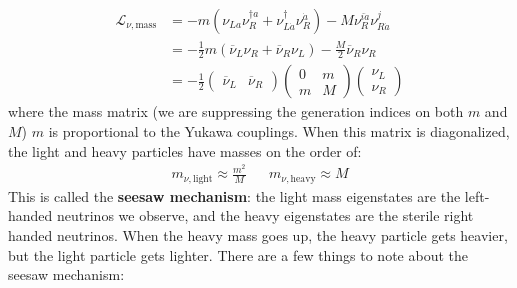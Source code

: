 \documentclass[11pt, oneside]{article}   	%
\theoremstyle{definition}
\numberwithin{equation}{subsection}		%
\begin{document}
\begin{align}
	\mathcal L_{\nu, \mathrm{mass}} &= -m(\nu_{La} \nu_{R}^{\dagger a} + \nu_{L\dot a}^\dagger \nu_R^{\dot a}) - M\nu_R^{i\dot a}
	\nu_{R\dot a}^j \\
	&= -\frac{1}{2}m(\overline\nu_L\nu_R + \overline\nu_R\nu_L) - \frac{M}{2}\overline\nu_R\nu_R \\
	&= -\frac{1}{2}\begin{pmatrix} \overline\nu_L & \overline\nu_R \end{pmatrix} \begin{pmatrix} 0 & m \\ m & M \end{pmatrix} 
	\begin{pmatrix} \nu_L \\ \nu_R \end{pmatrix}
\end{align}
where the mass matrix (we are suppressing the generation indices on both $m$ and $M$) $m$ is proportional to the Yukawa couplings. 
When this matrix is diagonalized, the light and heavy particles have masses on the order of:
\begin{align}
	m_{\nu, \mathrm{light}}\approx\frac{m^2}{M} && m_{\nu, \mathrm{heavy}}\approx M
\end{align}
This is called the \textbf{seesaw mechanism}: the light mass eigenstates are the left-handed neutrinos we observe, and the heavy eigenstates 
are the sterile right handed neutrinos. When the heavy mass goes up, the heavy particle gets heavier, but the light particle gets lighter. 
There are a few things to note about the seesaw mechanism:
\end{document}
